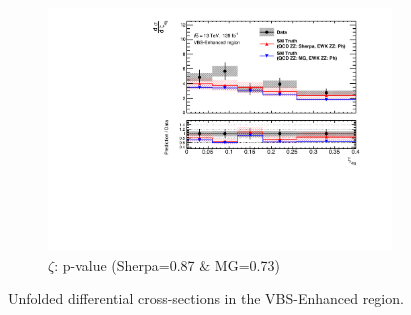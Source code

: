 \begin{figure}[!htbp]
\begin{subfigure}{.49\textwidth}
        \includegraphics[width=.98\linewidth]{figures/Results/CrossSection_VBSEnhanced/xs_centrality_SR.pdf}
        \caption{ \footnotesize{$\zeta$: p-value (Sherpa=0.87 $\&$ MG=0.73)} }
    \end{subfigure}
    \caption{Unfolded differential cross-sections in the VBS-Enhanced region.}  \label{fig:unfolded_xs_VBS_Enhanced_b}
\end{figure}